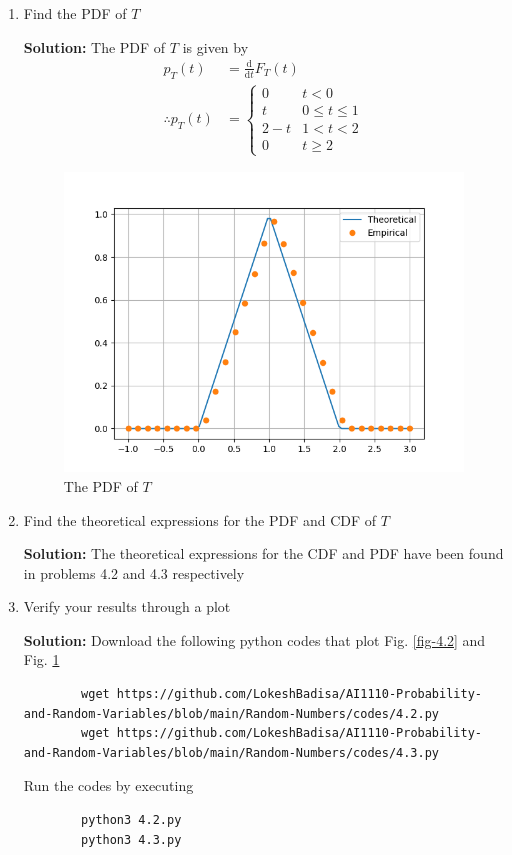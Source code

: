 \documentclass[journal,12pt,twocolumn]{IEEEtran}
\newcommand{\solution}{\noindent \textbf{Solution: }}
\providecommand{\der}[1]{\mathrm{d} #1}
\numberwithin{equation}{section}
\renewcommand\thesection{\arabic{section}}
\begin{document}
\begin{enumerate}[label=\thesection.\arabic*,ref=\thesection.\theenumi]
	\item Find the PDF of $T$
	
	\solution The PDF of $T$ is given by
	\begin{align}
		p_T(t) &= \frac{\der{}}{\der{t}} F_T(t) \\
		\therefore p_T(t) &=
		\begin{cases}
			0 & t < 0 \\
			t & 0 \le t \le 1 \\
			2 - t & 1 < t < 2 \\
			0 & t \ge 2
		\end{cases}
	\end{align}
	
	\begin{figure}
		\centering
		\includegraphics[width=\columnwidth]{./figs/4.3.png}
		\caption{The PDF of $T$}
		\label{fig-4.3}
	\end{figure}		
	
	\item Find the theoretical expressions for the PDF and CDF of $T$
	
	\solution The theoretical expressions for the CDF and PDF have been found in problems 4.2 and 4.3 respectively

	\item Verify your results through a plot
	
	\solution Download the following python codes that plot Fig. \ref{fig-4.2} and Fig. \ref{fig-4.3}
	\begin{lstlisting}
		wget https://github.com/LokeshBadisa/AI1110-Probability-and-Random-Variables/blob/main/Random-Numbers/codes/4.2.py
		wget https://github.com/LokeshBadisa/AI1110-Probability-and-Random-Variables/blob/main/Random-Numbers/codes/4.3.py
	\end{lstlisting}
	Run the codes by executing
	\begin{lstlisting}
		python3 4.2.py
		python3 4.3.py
	\end{lstlisting}
	
	
	\end{enumerate}
	
\end{document}
